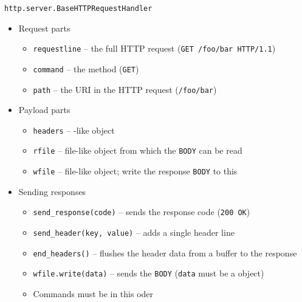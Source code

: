 \begin{frame}{\texttt{http.server.BaseHTTPRequestHandler}}
%
\begin{itemize}
\item Request parts
	\begin{itemize}
	\item \texttt{requestline} -- the full HTTP request (\zB \texttt{GET /foo/bar HTTP/1.1})
	\item \texttt{command} -- the method (\zB \texttt{GET})
	\item \texttt{path} -- the URI in the HTTP request (\zB \texttt{/foo/bar})
	\end{itemize}
\pause
\item Payload parts
	\begin{itemize}
	\item \texttt{headers} -- -like object
	\item \texttt{rfile} -- file-like object from which the \texttt{BODY} can be read
	\item \texttt{wfile} -- file-like object; write the response \texttt{BODY} to this
	\end{itemize}
\pause
\item Sending responses
	\begin{itemize}
	\item \texttt{send\_response(code)} -- sends the response code (\zB \texttt{200 OK})
	\item \texttt{send\_header(key, value)} -- adds a single header line
	\item \texttt{end\_headers()} -- flushes the header data from a buffer to the response
	\item \texttt{wfile.write(data)} -- sends the \texttt{BODY} (\texttt{data} must be a  object)
	\item Commands must be in this oder
	\end{itemize}
\end{itemize}
%
\end{frame}


